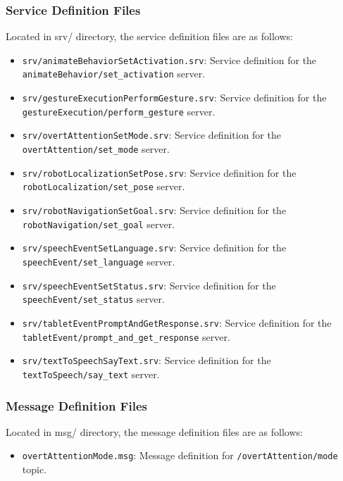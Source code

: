 \documentclass{CSSRforAfrica}
\begin{document}
\subsubsection{Service Definition Files}
Located in srv/ directory, the service definition files are as follows:
\begin{itemize}
    \item \texttt{\small srv/\textnormal{animateBehaviorSetActivation.srv}}: Service definition for the \texttt{\small animateBehavior/set\_activation} server.
    \item \texttt{\small srv/\textnormal{gestureExecutionPerformGesture.srv}}: Service definition for the
    \\ \texttt{\small gestureExecution/perform\_gesture} server.
    \item \texttt{\small srv/\textnormal{overtAttentionSetMode.srv}}: Service definition for the \texttt{\small overtAttention/set\_mode} server.
    \item \texttt{\small srv/\textnormal{robotLocalizationSetPose.srv}}: Service definition for the \texttt{\small robotLocalization/set\_pose} server.
    \item \texttt{\small srv/\textnormal{robotNavigationSetGoal.srv}}: Service definition for the \texttt{\small robotNavigation/set\_goal} server.
    \item \texttt{\small srv/\textnormal{speechEventSetLanguage.srv}}: Service definition for the \texttt{\small speechEvent/set\_language} server.
    \item \texttt{\small srv/\textnormal{speechEventSetStatus.srv}}: Service definition for the \texttt{\small speechEvent/set\_status} server.
    \item \texttt{\small srv/\textnormal{tabletEventPromptAndGetResponse.srv}}: Service definition for the 
    \\ \texttt{\small tabletEvent/prompt\_and\_get\_response} server.
    \item \texttt{\small srv/\textnormal{textToSpeechSayText.srv}}: Service definition for the \texttt{\small textToSpeech/say\_text} server.

\end{itemize}

\subsubsection{Message Definition Files}
Located in msg/ directory, the message definition files are as follows:
\begin{itemize}
    \item \texttt{\small overtAttentionMode.msg}: Message definition for \texttt{\small /overtAttention/mode} topic.
\end{itemize}
\end{document}
